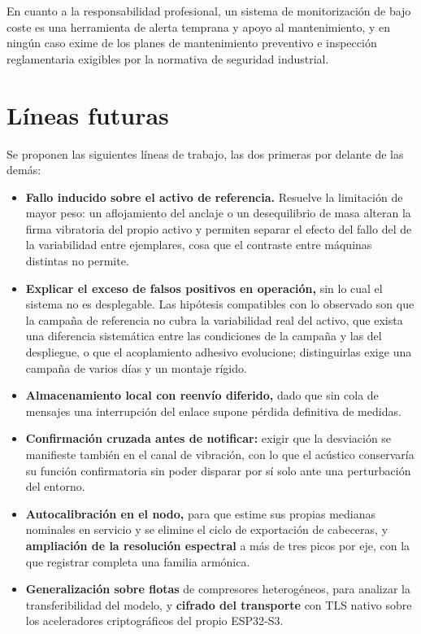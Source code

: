 En cuanto a la responsabilidad profesional, un sistema de monitorización de bajo coste es una
herramienta de alerta temprana y apoyo al mantenimiento, y en ningún caso exime de los planes de
mantenimiento preventivo e inspección reglamentaria exigibles por la normativa de seguridad
industrial.

\section{Líneas futuras}

Se proponen las siguientes líneas de trabajo, las dos primeras por delante de las demás:

\begin{itemize}
    \item \textbf{Fallo inducido sobre el activo de referencia.} Resuelve la limitación de mayor
        peso: un aflojamiento del anclaje o un desequilibrio de masa alteran la firma vibratoria
        del propio activo y permiten separar el efecto del fallo del de la variabilidad entre
        ejemplares, cosa que el contraste entre máquinas distintas no permite.
    \item \textbf{Explicar el exceso de falsos positivos en operación,} sin lo cual el sistema no
        es desplegable. Las hipótesis compatibles con lo observado son que la campaña de referencia
        no cubra la variabilidad real del activo, que exista una diferencia sistemática entre las
        condiciones de la campaña y las del despliegue, o que el acoplamiento adhesivo evolucione;
        distinguirlas exige una campaña de varios días y un montaje rígido.
    \item \textbf{Almacenamiento local con reenvío diferido,} dado que sin cola de mensajes una
        interrupción del enlace supone pérdida definitiva de medidas.
    \item \textbf{Confirmación cruzada antes de notificar:} exigir que la desviación se manifieste
        también en el canal de vibración, con lo que el acústico conservaría su función
        confirmatoria sin poder disparar por sí solo ante una perturbación del entorno.
    \item \textbf{Autocalibración en el nodo,} para que estime sus propias medianas nominales en
        servicio y se elimine el ciclo de exportación de cabeceras, y \textbf{ampliación de la
        resolución espectral} a más de tres picos por eje, con la que registrar completa una
        familia armónica.
    \item \textbf{Generalización sobre flotas} de compresores heterogéneos, para analizar la
        transferibilidad del modelo, y \textbf{cifrado del transporte} con TLS nativo sobre los
        aceleradores criptográficos del propio ESP32-S3.
\end{itemize}
